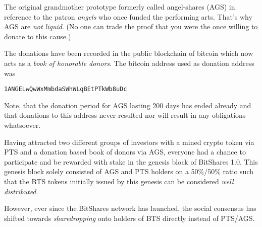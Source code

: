 The original grandmother prototype formerly called angel-shares (AGS) in
reference to the patron \emph{angels} who once funded the performing arts.
That's why AGS are \emph{not liquid}. (No one can trade the proof that you were
the once willing to donate to this cause.) 

The donations have been recorded in the public blockchain of bitcoin which now
acts as a \emph{book of honorable donors}. The bitcoin address used as donation
address was 
\begin{center}
 \texttt{1ANGELwQwWxMmbdaSWhWLqBEtPTkWb8uDc}
\end{center}
Note, that the donation period for AGS lasting 200 days has ended already and
that donations to this address never resulted nor will result in any
obligations whatsoever.

\bigskip

Having attracted two different groups of investors with a mined crypto token
via PTS and a donation based book of donors via AGS, everyone had a chance to
participate and be rewarded with stake in the genesis block of BitShares 1.0.
This genesis block solely consisted of AGS and PTS holders on a 50\%/50\% ratio
such that the BTS tokens initially issued by this genesis can be considered
\emph{well distributed}.

However, ever since the BitShares network has launched, the social consensus
has shifted towards \emph{sharedropping} onto holders of BTS directly instead
of PTS/AGS.
